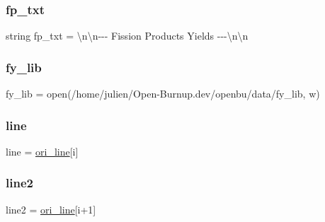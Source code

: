 \mbox{\label{namespaceconv__fylib_abcdb1a110e2a54bac4567f258e4e314f}} 
\subsubsection{\texorpdfstring{fp\+\_\+txt}{fp\_txt}}
{\footnotesize\ttfamily string fp\+\_\+txt = \textquotesingle{}\textbackslash{}n\textbackslash{}n-\/-\/-\/ Fission Products Yields -\/-\/-\/\textbackslash{}n\textbackslash{}n\textquotesingle{}}

\mbox{\label{namespaceconv__fylib_a4260815d8870a367ec3d10f083298e0b}} 
\subsubsection{\texorpdfstring{fy\+\_\+lib}{fy\_lib}}
{\footnotesize\ttfamily fy\+\_\+lib = open(\textquotesingle{}/home/julien/Open-\/Burnup.\+dev/openbu/data/fy\+\_\+lib\textquotesingle{}, \textquotesingle{}w\textquotesingle{})}

\mbox{\label{namespaceconv__fylib_a4fa05b1f00fcde100685cc887554b93b}} 
\subsubsection{\texorpdfstring{line}{line}}
{\footnotesize\ttfamily line = \mbox{\hyperlink{namespaceconv__fylib_a3c3d66214a7b142665fc74268c938fbd}{ori\+\_\+line}}\mbox{[}i\mbox{]}}

\mbox{\label{namespaceconv__fylib_aa845dfb550c1c69d070c649a78fa1b89}} 
\subsubsection{\texorpdfstring{line2}{line2}}
{\footnotesize\ttfamily line2 = \mbox{\hyperlink{namespaceconv__fylib_a3c3d66214a7b142665fc74268c938fbd}{ori\+\_\+line}}\mbox{[}i+1\mbox{]}}

